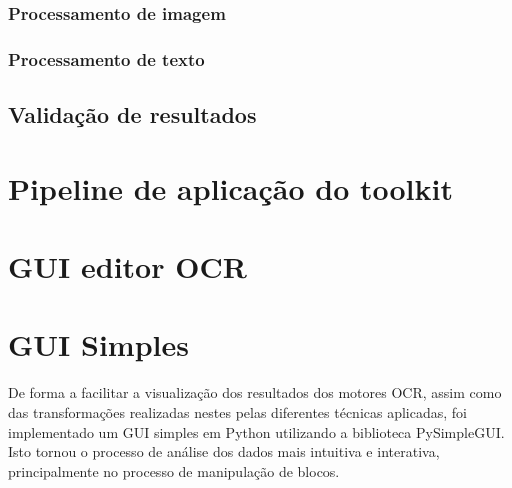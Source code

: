 




\label{contribution_categorize_blocks}


\label{contribution_divide_blocks}


\label{contribution_reading_order}

\label{contribution_result_segmentation}



\subsubsection{Processamento de imagem}
\label{contribution_image_processing}

\subsubsection{Processamento de texto}
\label{contribution_text_processing}


\subsection{Validação de resultados}
\label{contribution_results_validation}




\section{Pipeline de aplicação do toolkit}
\label{contribution_toolkit_pipeline}


\section{GUI editor OCR}
\label{contribution_ocr_editor}


\section{GUI Simples}
\label{gui_simples}

De forma a facilitar a visualização dos resultados dos motores OCR, assim como das transformações realizadas nestes pelas diferentes técnicas aplicadas, foi implementado um GUI simples em Python utilizando a biblioteca PySimpleGUI. Isto tornou o processo de análise dos dados mais intuitiva e interativa, principalmente no processo de manipulação de blocos.

